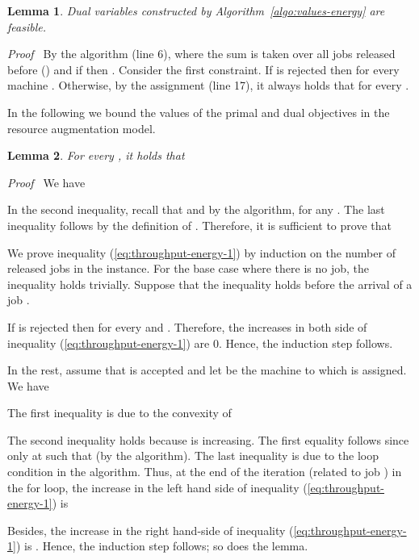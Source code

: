 \documentclass[11pt]{article}
\newenvironment{proof}{\noindent\emph{Proof\ }}{\hspace*{\fill}\medskip}
\newtheorem{lemma}{Lemma}
\begin{document}
\begin{lemma}
Dual variables constructed by Algorithm~\ref{algo:values-energy} are feasible.
\end{lemma}
\begin{proof}
By the algorithm (line 6),  
where the sum is taken over all jobs  released before  () and
if  then . 
Consider the first constraint. If  is rejected then  for every machine .
Otherwise, by the assignment (line 17),
it always holds that  for every .
\end{proof}

In the following we bound the values of the primal and dual objectives 
in the resource augmentation model.

\begin{lemma}		\label{lem:throughput-energy}
For every , it holds that 

\end{lemma}
\begin{proof}
We have 

In the second inequality, recall that 
and by the algorithm, 
for any . 
The last inequality follows by the 
definition of . Therefore, it is sufficient to prove that 

We prove inequality (\ref{eq:throughput-energy-1})
by induction on the number of released jobs in the instance. For the base case where there is 
no job, the inequality holds trivially. Suppose that the inequality holds before the arrival of a job .

If  is rejected then  for every  and . 
Therefore, the increases in both side of inequality (\ref{eq:throughput-energy-1}) are 0.
Hence, the induction step follows. 

In the rest, assume that  is accepted and let  be the machine 
to which  is assigned. 
We have

The first inequality is due to the convexity of 
 
The second inequality holds because  is increasing. 
The first equality follows since
 only at  such that  (by the algorithm).     
The last inequality is due to the loop condition in the algorithm.
Thus, at the end of the iteration (related to job ) in the for loop,
the increase in the left hand side of inequality (\ref{eq:throughput-energy-1}) is
 
Besides, the increase in the right hand-side of inequality (\ref{eq:throughput-energy-1}) is 
.
Hence, the induction step follows; so does the lemma.
\end{proof}
\end{document}
